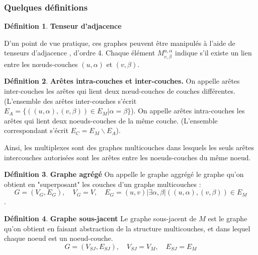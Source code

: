 \documentclass[11pt,a4paper]{article}
\theoremstyle{definition}
\newtheorem{defn}{Définition}
\theoremstyle{remark}
\theoremstyle{remark}
\begin{document}

\subsubsection{Quelques définitions}

\begin{defn}{\textbf{Tenseur d'adjacence}}
	
\end{defn}
D'un point de vue pratique, ces graphes peuvent être manipulés à l'aide de tenseurs d'adjacence \cite{mldd}, d'ordre 4. Chaque élément $M^{u,\alpha}_{v,\beta}$ indique s'il existe un lien entre les nœuds-couches $(u,\alpha)$ et $(v,\beta)$.

\begin{defn}{\textbf{Arêtes intra-couches et inter-couches.}}
	On appelle arêtes inter-couches les arêtes qui lient deux nœud-couches de couches différentes. (L'ensemble des arêtes inter-couches s'écrit $E_A = \{((u,\alpha),(v,\beta)) \in E_M | \alpha = \beta\}$). On appelle arêtes intra-couches les arêtes qui lient deux noeuds-couches de la même couche. (L'ensemble correspondant s'écrit $E_C = E_M\backslash E_A$).
\end{defn}
Ainsi, les multiplexes sont des graphes multicouches dans lesquels les seuls arêtes intercouches autorisées sont les arêtes entre les noeuds-couches du même noeud.

\begin{defn}{\textbf{Graphe agrégé}}
	On appelle le graphe aggrégé le graphe qu'on obtient en "superposant" les couches d'un graphe multicouches : $$G=(V_G,E_G), \quad V_G=V, \quad E_G={(u,v)|\exists \alpha, \beta | ((u,\alpha),(v,\beta)) \in E_M}$$.
\end{defn}

\begin{defn}{\textbf{Graphe sous-jacent}}
Le graphe sous-jacent de $M$ est le graphe qu'on obtient en faisant abstraction de la structure multicouches, et dans lequel chaque noeud est un noeud-couche.
$$G=(V_{SJ},E_{SJ}), \quad V_{SJ} = V_M, \quad E_{SJ}=E_M$$
\end{defn}
\end{document}
